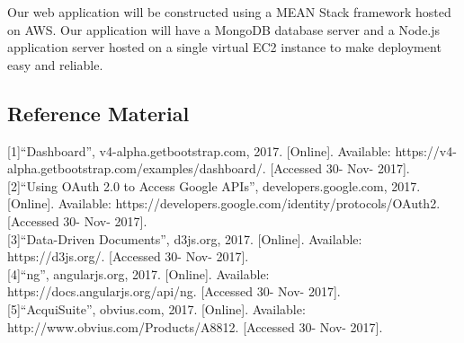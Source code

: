 \documentclass[journal,10pt,onecolumn,compsoc]{IEEEtran}
\begin{document}
    \noindent Our web application will be constructed using a MEAN Stack framework hosted on AWS. Our application will have a MongoDB database server and a Node.js application server hosted on a single virtual EC2 instance to make deployment easy and reliable.
   
	\subsection{Reference Material}
	{[1]}``Dashboard'', v4-alpha.getbootstrap.com, 2017. [Online]. Available: https://v4-alpha.getbootstrap.com/examples/dashboard/. [Accessed 30- Nov- 2017]. \\
	{[2]}``Using OAuth 2.0 to Access Google APIs'', developers.google.com, 2017. [Online]. Available: 		https://developers.google.com/identity/protocols/OAuth2. [Accessed 30- Nov- 2017]. \\
	{[3]}``Data-Driven Documents'', d3js.org, 2017. [Online]. Available: https://d3js.org/. [Accessed 30- Nov- 2017]. \\
	{[4]}``ng'', angularjs.org, 2017. [Online]. Available: https://docs.angularjs.org/api/ng. [Accessed 30- Nov- 2017]. \\
	{[5]}``AcquiSuite'', obvius.com, 2017. [Online]. Available: http://www.obvius.com/Products/A8812. [Accessed 30- Nov- 2017]. \\
	
\end{document}
